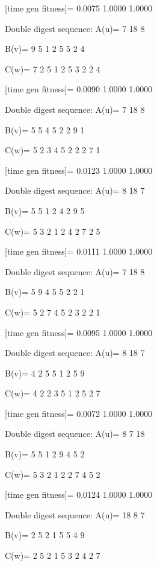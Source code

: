 [time gen fitness]=
    0.0075    1.0000    1.0000

Double digest sequence:
A(u)=
     7    18     8

B(v)=
     9     5     1     2     5     5     2     4

C(w)=
     7     2     5     1     2     5     3     2     2     4

[time gen fitness]=
    0.0090    1.0000    1.0000

Double digest sequence:
A(u)=
     7    18     8

B(v)=
     5     5     4     5     2     2     9     1

C(w)=
     5     2     3     4     5     2     2     2     7     1

[time gen fitness]=
    0.0123    1.0000    1.0000

Double digest sequence:
A(u)=
     8    18     7

B(v)=
     5     5     1     2     4     2     9     5

C(w)=
     5     3     2     1     2     4     2     7     2     5

[time gen fitness]=
    0.0111    1.0000    1.0000

Double digest sequence:
A(u)=
     7    18     8

B(v)=
     5     9     4     5     5     2     2     1

C(w)=
     5     2     7     4     5     2     3     2     2     1

[time gen fitness]=
    0.0095    1.0000    1.0000

Double digest sequence:
A(u)=
     8    18     7

B(v)=
     4     2     5     5     1     2     5     9

C(w)=
     4     2     2     3     5     1     2     5     2     7

[time gen fitness]=
    0.0072    1.0000    1.0000

Double digest sequence:
A(u)=
     8     7    18

B(v)=
     5     5     1     2     9     4     5     2

C(w)=
     5     3     2     1     2     2     7     4     5     2

[time gen fitness]=
    0.0124    1.0000    1.0000

Double digest sequence:
A(u)=
    18     8     7

B(v)=
     2     5     2     1     5     5     4     9

C(w)=
     2     5     2     1     5     3     2     4     2     7

